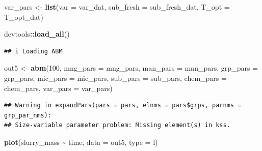 \documentclass[
]{article}
\newenvironment{Shaded}{\begin{snugshade}}{\end{snugshade}}
\newcommand{\AttributeTok}[1]{\textcolor[rgb]{0.13,0.29,0.53}{#1}}
\newcommand{\DecValTok}[1]{\textcolor[rgb]{0.00,0.00,0.81}{#1}}
\newcommand{\FunctionTok}[1]{\textcolor[rgb]{0.13,0.29,0.53}{\textbf{#1}}}
\newcommand{\NormalTok}[1]{#1}
\newcommand{\OtherTok}[1]{\textcolor[rgb]{0.56,0.35,0.01}{#1}}
\newcommand{\SpecialCharTok}[1]{\textcolor[rgb]{0.81,0.36,0.00}{\textbf{#1}}}
\newcommand{\StringTok}[1]{\textcolor[rgb]{0.31,0.60,0.02}{#1}}
\begin{document}
\begin{Shaded}
\begin{Highlighting}[]
\NormalTok{var\_pars }\OtherTok{\textless{}{-}} \FunctionTok{list}\NormalTok{(}\AttributeTok{var =}\NormalTok{ var\_dat, }\AttributeTok{sub\_fresh =}\NormalTok{ sub\_fresh\_dat, }\AttributeTok{T\_opt =}\NormalTok{ T\_opt\_dat)}
\end{Highlighting}
\end{Shaded}

\begin{Shaded}
\begin{Highlighting}[]
\NormalTok{devtools}\SpecialCharTok{::}\FunctionTok{load\_all}\NormalTok{()}
\end{Highlighting}
\end{Shaded}

\begin{verbatim}
## i Loading ABM
\end{verbatim}

\begin{Shaded}
\begin{Highlighting}[]
\NormalTok{out5 }\OtherTok{\textless{}{-}} \FunctionTok{abm}\NormalTok{(}\DecValTok{100}\NormalTok{,}
             \AttributeTok{mng\_pars =}\NormalTok{ mng\_pars,}
             \AttributeTok{man\_pars =}\NormalTok{ man\_pars,}
             \AttributeTok{grp\_pars =}\NormalTok{ grp\_pars,}
             \AttributeTok{mic\_pars =}\NormalTok{ mic\_pars,}
             \AttributeTok{sub\_pars =}\NormalTok{ sub\_pars,}
             \AttributeTok{chem\_pars =}\NormalTok{ chem\_pars,}
             \AttributeTok{var\_pars =}\NormalTok{ var\_pars)}
\end{Highlighting}
\end{Shaded}

\begin{verbatim}
## Warning in expandPars(pars = pars, elnms = pars$grps, parnms = grp_par_nms):
## Size-variable parameter problem: Missing element(s) in kss.
\end{verbatim}

\begin{Shaded}
\begin{Highlighting}[]
\FunctionTok{plot}\NormalTok{(slurry\_mass }\SpecialCharTok{\textasciitilde{}}\NormalTok{ time, }\AttributeTok{data =}\NormalTok{ out5, }\AttributeTok{type =} \StringTok{\textquotesingle{}l\textquotesingle{}}\NormalTok{)}
\end{Highlighting}
\end{Shaded}
\end{document}
